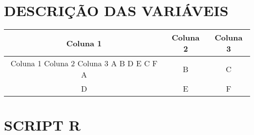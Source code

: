 \documentclass[
	12pt,				%
	openright,			%
	oneside,      %
	a4paper,			%
	english,			%
	french,				%
	spanish,			%
	brazil,				%
	]{abntex2}\usepackage[]{graphicx}\usepackage[]{xcolor}
\begin{document}
\begin{apendicesenv}

\partapendices

\chapter{DESCRIÇÃO DAS VARIÁVEIS}

\begin{tabular}{ccc} 
  \hline 
  Coluna 1 & Coluna 2 & Coluna 3 \\ 
  \hline 
  Coluna 1 Coluna 2 Coluna 3 A B D E C F A & B & C \\
  D & E & F \\ 
  \hline 
\end{tabular}


\chapter{SCRIPT R}



\end{apendicesenv}

\begin{comment}

\begin{anexosenv}

\partanexos

\chapter{Morbi ultrices rutrum lorem.}
\lipsum[30]

\chapter{Cras non urna sed feugiat cum sociis natoque penatibus et magnis dis
parturient montes nascetur ridiculus mus}

\lipsum[31]

\chapter{Fusce facilisis lacinia dui}

\lipsum[32]

\end{anexosenv}
\end{comment}


\printindex
\end{document}
